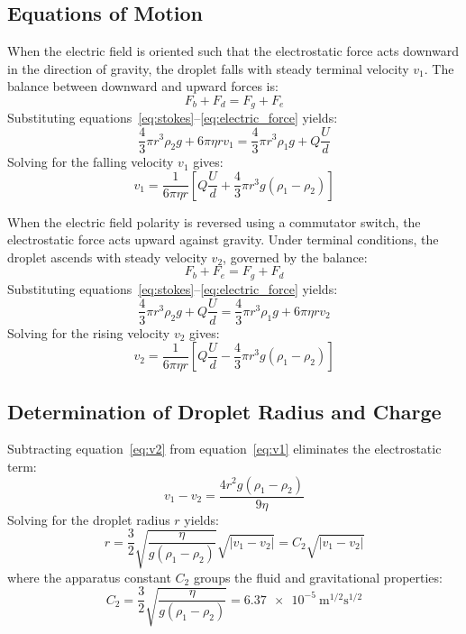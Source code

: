 \documentclass[journal]{IEEEtran}
\begin{document}
\subsection{Equations of Motion}
When the electric field is oriented such that the electrostatic force acts downward in the direction of gravity, the droplet falls with steady terminal velocity $v_1$. The balance between downward and upward forces is:
\begin{equation}
    F_b + F_d = F_g + F_e
    \label{eq:falling_balance}
\end{equation}
Substituting equations~\eqref{eq:stokes}--\eqref{eq:electric_force} yields:
\begin{equation}
    \frac{4}{3}\pi r^3 \rho_2 g + 6\pi \eta r v_1 = \frac{4}{3}\pi r^3 \rho_1 g + Q \frac{U}{d}
\end{equation}
Solving for the falling velocity $v_1$ gives:
\begin{equation}
    v_1 = \frac{1}{6\pi \eta r} \left[ Q \frac{U}{d} + \frac{4}{3}\pi r^3 g (\rho_1 - \rho_2) \right]
    \label{eq:v1}
\end{equation}

When the electric field polarity is reversed using a commutator switch, the electrostatic force acts upward against gravity. Under terminal conditions, the droplet ascends with steady velocity $v_2$, governed by the balance:
\begin{equation}
    F_b + F_e = F_g + F_d
    \label{eq:rising_balance}
\end{equation}
Substituting equations~\eqref{eq:stokes}--\eqref{eq:electric_force} yields:
\begin{equation}
    \frac{4}{3}\pi r^3 \rho_2 g + Q \frac{U}{d} = \frac{4}{3}\pi r^3 \rho_1 g + 6\pi \eta r v_2
\end{equation}
Solving for the rising velocity $v_2$ gives:
\begin{equation}
    v_2 = \frac{1}{6\pi \eta r} \left[ Q \frac{U}{d} - \frac{4}{3}\pi r^3 g (\rho_1 - \rho_2) \right]
    \label{eq:v2}
\end{equation}

\subsection{Determination of Droplet Radius and Charge}
Subtracting equation~\eqref{eq:v2} from equation~\eqref{eq:v1} eliminates the electrostatic term:
\begin{equation}
    v_1 - v_2 = \frac{4 r^2 g (\rho_1 - \rho_2)}{9\eta}
\end{equation}
Solving for the droplet radius $r$ yields:
\begin{equation}
    r = \frac{3}{2} \sqrt{\frac{\eta}{g(\rho_1 - \rho_2)}} \sqrt{|v_1 - v_2|} = C_2 \sqrt{|v_1 - v_2|}
    \label{eq:radius}
\end{equation}
where the apparatus constant $C_2$ groups the fluid and gravitational properties:
\begin{equation}
    C_2 = \frac{3}{2} \sqrt{\frac{\eta}{g(\rho_1 - \rho_2)}} = \SI{6.37e-5}{\meter^{1/2}\second^{1/2}}
    \label{eq:C2}
\end{equation}
\end{document}
